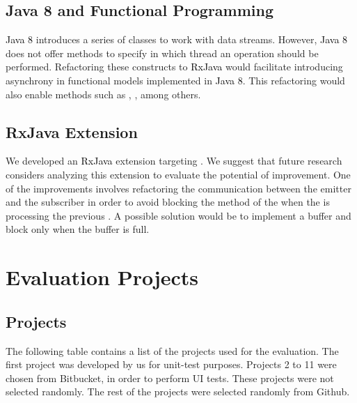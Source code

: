 \documentclass[type=bsc,accentcolor=tud9c]{tudthesis}
\newcommand{\framework}[1]{\textcolor{black}{#1}}
\begin{document}
\subsection{Java 8 and Functional Programming}
\framework{Java 8} introduces a series of classes to work with data streams. However, \framework{Java 8} does not offer methods to specify in which thread an operation should be performed. Refactoring these constructs to \framework{RxJava} would facilitate introducing asynchrony in functional models implemented in \framework{Java 8}. This refactoring would also enable methods such as , , among others.



\subsection{RxJava Extension}
We developed an \framework{RxJava} extension targeting . We suggest that future research considers analyzing this extension to evaluate the potential of improvement. One of the improvements involves refactoring the communication between the emitter  and the subscriber  in order to avoid blocking the  method of the  when the  is processing the previous . A possible solution would be to implement a buffer and block only when the buffer is full.


\nocite{*}



\def\appendixstart{\chapter{Appendix} \section{SwingWorker API}\label{swingworkerapi}}



\section{Evaluation Projects}
\subsection{Projects}
The following table contains a list of the projects used for the evaluation. The first project was developed by us for unit-test purposes. Projects 2 to 11 were chosen from Bitbucket, in order to perform UI tests. These projects were not selected randomly. The rest of the projects were selected randomly from Github.
\label{appendix:eval-projects}

\end{document}
